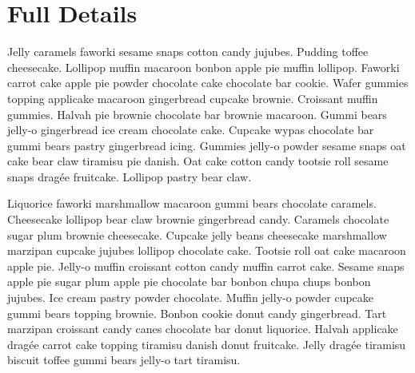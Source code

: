 \chapter{Full Details}
Jelly caramels faworki sesame snaps cotton candy jujubes. Pudding toffee cheesecake. Lollipop muffin macaroon bonbon apple pie muffin lollipop. Faworki carrot cake apple pie powder chocolate cake chocolate bar cookie. Wafer gummies topping applicake macaroon gingerbread cupcake brownie. Croissant muffin gummies. Halvah pie brownie chocolate bar brownie macaroon. Gummi bears jelly-o gingerbread ice cream chocolate cake. Cupcake wypas chocolate bar gummi bears pastry gingerbread icing. Gummies jelly-o powder sesame snaps oat cake bear claw tiramisu pie danish. Oat cake cotton candy tootsie roll sesame snaps dragée fruitcake. Lollipop pastry bear claw.

Liquorice faworki marshmallow macaroon gummi bears chocolate caramels. Cheesecake lollipop bear claw brownie gingerbread candy. Caramels chocolate sugar plum brownie cheesecake. Cupcake jelly beans cheesecake marshmallow marzipan cupcake jujubes lollipop chocolate cake. Tootsie roll oat cake macaroon apple pie. Jelly-o muffin croissant cotton candy muffin carrot cake. Sesame snaps apple pie sugar plum apple pie chocolate bar bonbon chupa chups bonbon jujubes. Ice cream pastry powder chocolate. Muffin jelly-o powder cupcake gummi bears topping brownie. Bonbon cookie donut candy gingerbread. Tart marzipan croissant candy canes chocolate bar donut liquorice. Halvah applicake dragée carrot cake topping tiramisu danish donut fruitcake. Jelly dragée tiramisu biscuit toffee gummi bears jelly-o tart tiramisu.
